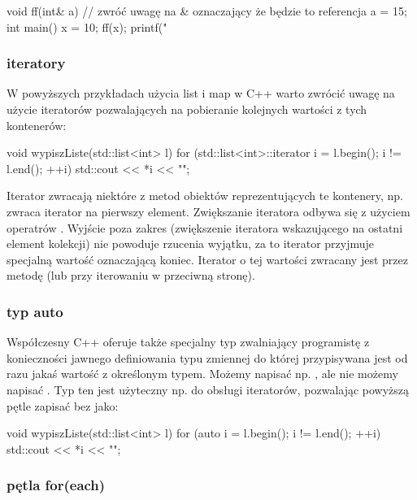 \begin{CodeFrame*}[c]{}
void ff(int& a) { // zwróć uwagę na & oznaczający że będzie to referencja
    a = 15;
}
int main() {
    x = 10;
    ff(x);
    printf("%
}
\end{CodeFrame*}

\subsubsection{iteratory}

W powyższych przykładach użycia list i map w C++ warto zwrócić uwagę na użycie iteratorów pozwalających na pobieranie kolejnych wartości z tych kontenerów:

\begin{CodeFrame*}[cpp]{}
void wypiszListe(std::list<int> l) {
    for (std::list<int>::iterator i = l.begin(); i != l.end(); ++i) {
        std::cout << *i << "\n";
    }
}
\end{CodeFrame*}

Iterator zwracają niektóre z metod obiektów reprezentujących te kontenery, np.  zwraca iterator na pierwszy element.
Zwiększanie iteratora odbywa się z użyciem operatrów \cpp{++}.
Wyjście poza zakres (zwiększenie iteratora wskazującego na ostatni element kolekcji) nie powoduje rzucenia wyjątku, za to iterator przyjmuje specjalną wartość oznaczającą koniec.
Iterator o tej wartości zwracany jest przez metodę  (lub  przy iterowaniu w przeciwną stronę).

\subsubsection{typ auto}

Współczesny C++ oferuje także specjalny typ  zwalniający programistę z konieczności jawnego definiowania typu zmiennej do której przypisywana jest od razu jakaś wartość z określonym typem. Możemy napisać np. , ale nie możemy napisać . Typ ten jest użyteczny np. do obsługi iteratorów, pozwalając powyższą pętle zapisać bez  jako:

\begin{CodeFrame*}[cpp]{}
void wypiszListe(std::list<int> l) {
    for (auto i = l.begin(); i != l.end(); ++i) {
        std::cout << *i << "\n";
    }
}
\end{CodeFrame*}

\subsubsection{pętla for(each)}

